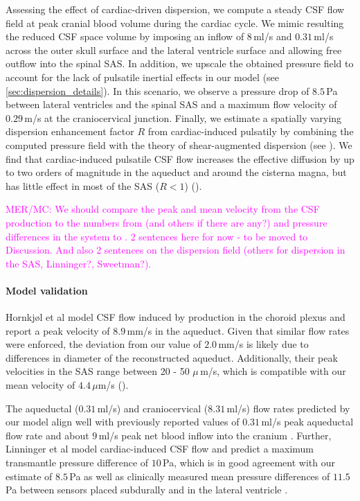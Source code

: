 \documentclass[fleqn,10pt]{wlscirep}
\newcommand{\mer}[1]{\textcolor{magenta}{#1}}
\begin{document}
Assessing the effect of cardiac-driven dispersion, we compute a steady CSF flow field at peak cranial blood volume during the cardiac cycle. We mimic resulting the reduced CSF space volume by imposing an inflow of $8\,$ml/s and $0.31\,$ml/s across the outer skull surface and the lateral ventricle surface and allowing free outflow into the spinal SAS. In addition, we upscale the obtained pressure field to account for the lack of pulsatile inertial effects in our model (see \ref{sec:dispersion_details}). In this scenario, we observe a pressure drop of $8.5\,$Pa between lateral ventricles and the spinal SAS and a maximum flow velocity of $0.29\,$m/s at the craniocervical junction.
Finally, we estimate a spatially varying dispersion enhancement factor $R$ from cardiac-induced pulsatily by combining the computed pressure field with the theory of shear-augmented dispersion (see ). We find that cardiac-induced pulsatile CSF flow increases the effective diffusion by up to two orders of magnitude in the aqueduct and around the cisterna magna, but has little effect in most of the SAS ($R < 1$) (). 

\mer{MER/MC: We should compare the peak and mean velocity from the CSF production to the numbers from \cite{hornkjol2022csf} (and others if there are any?) and pressure differences in the system to \cite{vinje2019respiratory}. 2 sentences here for now - to be moved to Discussion. And also 2 sentences on the dispersion field \cite{asgari2016glymphatic, keith2019dispersion, hornkjol2022csf, ray2021quantitative} (others for dispersion in the SAS, Linninger?, Sweetman?).}

\paragraph{Model validation}


Hornkjøl et al \cite{hornkjol2022csf} model CSF flow induced by production in the choroid plexus and report a peak velocity of $8.9\,$mm/s in the aqueduct. Given that similar flow rates were enforced, the deviation from our value of $2.0\,$mm/s is likely due to differences in diameter of the reconstructed aqueduct. Additionally, their peak velocities in the SAS range between 20 - 50 $\mu\,$m/s, which is compatible with our mean velocity of $4.4\,\mu$m/s ().

The aqueductal ($0.31\,$ml/s) and craniocervical ($8.31\,$ml/s) flow rates predicted by our model align well with previously reported values of $0.31\,$ml/s peak aqueductal flow rate \cite{vinje2019respiratory} and about $9\,$ml/s peak net blood inflow into the cranium \cite{baledent2014imaging}. Further, Linninger et al \cite{linninger2007cerebrospinal} model cardiac-induced CSF flow and predict a maximum transmantle pressure difference of $10\,$Pa, which is in good agreement with our estimate of $8.5\,$Pa as well as clinically measured mean pressure differences of $11.5\,$Pa between sensors placed subdurally and in the lateral ventricle \cite{vinje2019respiratory}.
\end{document}
